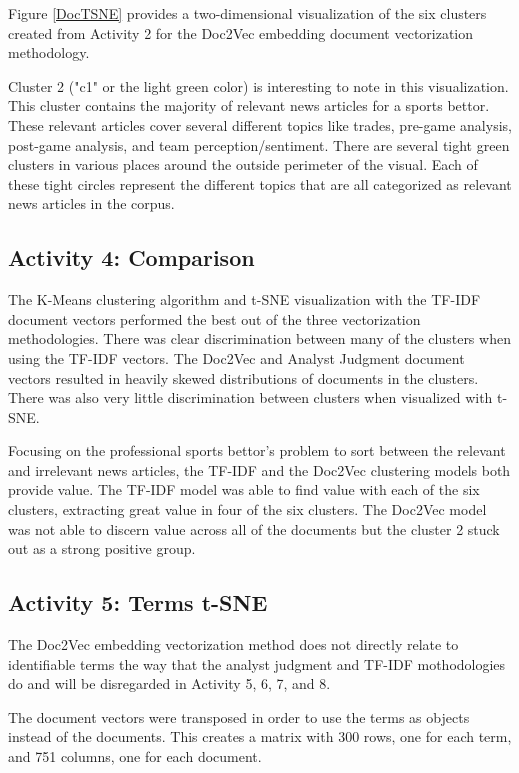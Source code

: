 \documentclass[5p,authoryear]{elsarticle}
\begin{document}
Figure \ref{DocTSNE} provides a two-dimensional visualization of the six clusters created from Activity 2 for the Doc2Vec embedding document vectorization methodology.

Cluster 2 ("c1" or the light green color) is interesting to note in this visualization. 
This cluster contains the majority of relevant news articles for a sports bettor.
These relevant articles cover several different topics like trades, pre-game analysis, post-game analysis, and team perception/sentiment.
There are several tight green clusters in various places around the outside perimeter of the visual.
Each of these tight circles represent the different topics that are all categorized as relevant news articles in the corpus.

\subsection{Activity 4: Comparison}\label{one}

The K-Means clustering algorithm and t-SNE visualization with the TF-IDF document vectors performed the best out of the three vectorization methodologies. 
There was clear discrimination between many of the clusters when using the TF-IDF vectors. 
The Doc2Vec and Analyst Judgment document vectors resulted in heavily skewed distributions of documents in the clusters. 
There was also very little discrimination between clusters when visualized with t-SNE.


Focusing on the professional sports bettor's problem to sort between the relevant and irrelevant news articles, the TF-IDF and the Doc2Vec clustering models both provide value.
The TF-IDF model was able to find value with each of the six clusters, extracting great value in four of the six clusters.
The Doc2Vec model was not able to discern value across all of the documents but the cluster 2 stuck out as a strong positive group.


\subsection{Activity 5: Terms t-SNE}\label{one}

The Doc2Vec embedding vectorization method does not directly relate to identifiable terms the way that the analyst judgment and TF-IDF mothodologies do and will be disregarded in Activity 5, 6, 7, and 8. 

The document vectors were transposed in order to use the terms as objects instead of the documents. 
This creates a matrix with 300 rows, one for each term, and 751 columns, one for each document.
\end{document}
